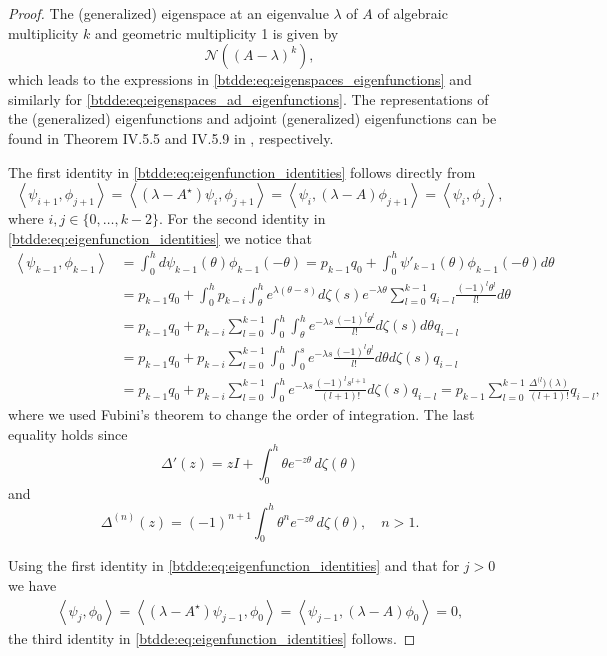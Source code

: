 \begin{proof}
The (generalized) eigenspace at an eigenvalue $\lambda$ of $A$ of algebraic multiplicity $k$ and geometric multiplicity 1 is given by 
\[
\mathcal{N}((A-\lambda)^k),
\]
which leads to the expressions in \cref{btdde:eq:eigenspaces_eigenfunctions}
and similarly for \cref{btdde:eq:eigenspaces_ad_eigenfunctions}. The representations
of the (generalized) eigenfunctions and adjoint (generalized) eigenfunctions
can be found in Theorem IV.5.5 and IV.5.9 in \cite{diekmann1995delay}, respectively.

The first identity in \cref{btdde:eq:eigenfunction_identities} follows directly from
\[
    \left<\psi_{i + 1},\phi_{j + 1}\right> = \left<(\lambda-A^\star)\psi_i,\phi_{j + 1}\right>
    = \left<\psi_i,(\lambda-A)\phi_{j + 1}\right>
    = \left<\psi_i,\phi_j\right>,
\]
where $i,j\in\{0,\dots,k-2\}$.
For the second identity in \cref{btdde:eq:eigenfunction_identities} we notice that
\begin{align*}
    \left<\psi_{k-1},\phi_{k-1}\right> 
        &= \int_0^h d\psi_{k-1}(\theta) \phi_{k-1}(-\theta) 
         = p_{k-1}q_0 + \int_0^h \psi'_{k-1}(\theta) \phi_{k-1}(-\theta) d\theta \\
        &=  p_{k-1}q_0 + \int_0^h p_{k-i} \int_{\theta}^h e^{\lambda(\theta-s)} d\zeta(s) 
                e^{-\lambda\theta} \sum_{l=0}^{k-1} q_{i-l} \frac{(-1)^l\theta^l}{l!}d\theta \\
        &=  p_{k-1}q_0 + p_{k-i} \sum_{l=0}^{k-1} \int_0^h \int_{\theta}^h e^{-\lambda s}  
                \frac{(-1)^l\theta^l}{l!} d\zeta(s) d\theta  q_{i-l}\\
        &=  p_{k-1}q_0 + p_{k-i} \sum_{l=0}^{k-1} \int_0^h \int_0^s e^{-\lambda s}  
                \frac{(-1)^l\theta^l}{l!}d\theta  d\zeta(s) q_{i-l}\\
        &=  p_{k-1}q_0 + p_{k-i} \sum_{l=0}^{k-1} \int_0^h  e^{-\lambda s}  
            \frac{(-1)^l s^{l + 1}}{(l + 1)!} d\zeta(s) q_{i-l}
        = p_{k-1} \sum_{l=0}^{k-1} \frac{\Delta^{(l})(\lambda)}{(l + 1)!} q_{i-l},
\end{align*}
where we used Fubini\textquoteright s theorem to change the order of
integration. The last equality holds since
\[
\Delta'(z) =  zI + \int_0^h{\theta e^{-z\theta}\,d\zeta(\theta)} 
\]
and
\[
\Delta^{(n)}(z) =  (-1)^{n + 1}\int_0^h{\theta^n e^{-z\theta}\,d\zeta(\theta)}, \quad n > 1.
\]

Using the first identity in \cref{btdde:eq:eigenfunction_identities} and that for $j>0$ we have
\begin{align*}
    \left< \psi_j,\phi_0\right> = \left< (\lambda-A^\star)\psi_{j-1},\phi_0\right> 
                                = \left< \psi_{j-1},(\lambda-A)\phi_0\right> = 0,
\end{align*}
the third identity in \cref{btdde:eq:eigenfunction_identities} follows.


\end{proof}
